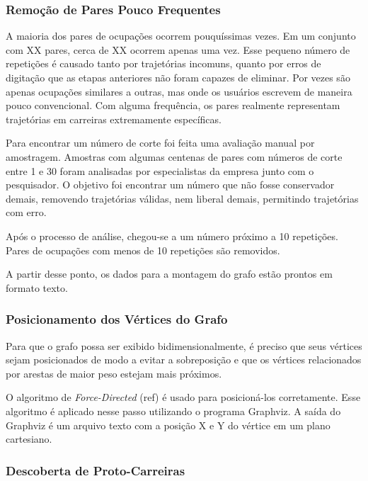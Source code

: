 \documentclass[12pt,a4paper]{article}
\theoremstyle{hypo}
\begin{document}
\subsubsection{Remoção de Pares Pouco Frequentes} \label{sec:grafo-final}

A maioria dos pares de ocupações ocorrem pouquíssimas vezes. Em um conjunto com XX pares, cerca de XX ocorrem apenas uma vez. Esse pequeno número de repetições é causado tanto por trajetórias incomuns, quanto por erros de digitação que as etapas anteriores não foram capazes de eliminar. Por vezes são apenas ocupações similares a outras, mas onde os usuários escrevem de maneira pouco convencional. Com alguma frequência, os pares realmente representam trajetórias em carreiras extremamente específicas.

Para encontrar um número de corte foi feita uma avaliação manual por amostragem. Amostras com algumas centenas de pares com números de corte entre 1 e 30 foram analisadas por especialistas da empresa junto com o pesquisador. O objetivo foi encontrar um número que não fosse conservador demais, removendo trajetórias válidas, nem liberal demais, permitindo trajetórias com erro.

Após o processo de análise, chegou-se a um número próximo a 10 repetições. Pares de ocupações com menos de 10 repetições são removidos.

A partir desse ponto, os dados para a montagem do grafo estão prontos em formato texto.

\subsubsection{Posicionamento dos Vértices do Grafo}

Para que o grafo possa ser exibido bidimensionalmente, é preciso que seus vértices sejam posicionados de modo a evitar a sobreposição e que os vértices relacionados por arestas de maior peso estejam mais próximos.

O algoritmo de \textit{Force-Directed} (ref) é usado para posicioná-los corretamente. Esse algoritmo é aplicado nesse passo utilizando o programa Graphviz. A saída do Graphviz é um arquivo texto com a posição X e Y do vértice em um plano cartesiano.

\subsubsection{Descoberta de Proto-Carreiras}

\end{document}
